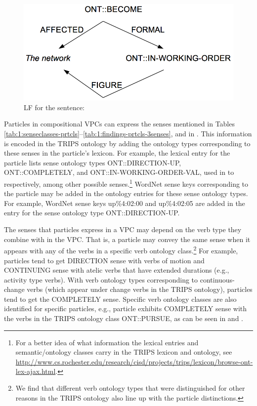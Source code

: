 \documentclass[output=paper,modfonts,nonflat]{langsci/langscibook}
\begin{document}
\begin{figure}
\includegraphics[width=.66\textwidth]{figures/LF3_uppercase}
\caption{LF for the sentence: }\label{fig:lf3}
\end{figure}


Particles in compositional VPCs can express the senses mentioned in Tables \ref{tab:1:senseclasses-prtcls}--\ref{tab:1:findings-prtcls-3senses}, and in . This information is encoded in the TRIPS ontology by adding the ontology types corresponding to these senses in the particle's lexicon. For example, the lexical entry for the particle  lists sense ontology types ONT::DIRECTION-UP, ONT::COMPLETELY, and ONT::IN-WORKING-ORDER-VAL, used in  to  respectively, among other possible senses.\footnote{For a better idea of what information the lexical entries and semantic/ontology classes carry in the TRIPS lexicon and ontology, see  \url{http://www.cs.rochester.edu/research/cisd/projects/trips/lexicon/browse-ont-lex-ajax.html}.} WordNet sense keys corresponding to the particle may be added in the ontology entries for these sense ontology types. For example, WordNet sense keys up\%4:02:00 and up\%4:02:05 are added in the entry for the sense ontology type ONT::DIRECTION-UP.

The senses that particles express in a VPC may depend on the verb type they combine with in the VPC. That is, a particle may convey the same sense when it appears with any of the verbs in a specific verb ontology class.\footnote{We find that different verb ontology types that were distinguished for other reasons in the TRIPS  ontology \citep{All07} also line up with the particle distinctions.} For example, particles tend to get DIRECTION sense with verbs of motion and CONTINUING sense with atelic verbs that have extended durations (e.g., activity type verbs). With verb ontology types corresponding to continuous-change verbs (which appear under change verbs in the TRIPS ontology), particles tend to get the COMPLETELY sense. Specific verb ontology classes are also identified for specific particles, e.g., particle  exhibits COMPLETELY sense with the verbs in the TRIPS ontology class ONT::PURSUE, as can be seen in 
and .
\end{document}
